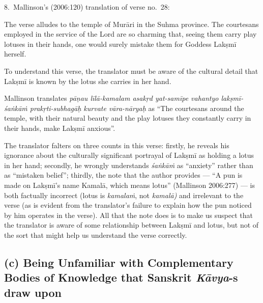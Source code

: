 8.~Mallinson’s (2006:120) translation of verse no.\ 28: 

The verse alludes to the temple of Murāri in the Suhma province. The courtesans employed in the service of the Lord are so charming that, seeing them carry play lotuses in their hands, one would surely mistake them for Goddess Lakṣmī herself. 

To understand this verse, the translator must be aware of the cultural detail that Lakṣmī is known by the lotus she carries in her hand. 

Mallinson translates \textsl{pāṇau līlā-kamalam asakṛd yat-samīpe vahantyo lakṣmī-śaṅkāṁ prakṛti-subhagāḥ kurvate vāra-nāryaḥ} as “The courtesans around the temple, with their natural beauty and the play lotuses they constantly carry in their hands, make Lakṣmī anxious”. 

The translator falters on three counts in this verse: firstly, he reveals his ignorance about the culturally significant portrayal of Lakṣmī as holding a lotus in her hand; secondly, he wrongly understands \textsl{śaṅkāṁ}  as “anxiety” rather than as “mistaken belief”; thirdly, the note that the author provides --- “A pun is made on Lakṣmī’s name Kamalā, which means lotus” (Mallinson 2006:277) --- is both factually incorrect (lotus is \textsl{kamalaṁ}, not \textsl{kamalā)}  and irrelevant to the verse (as is evident from the translator’s failure to explain how the pun noticed by him operates in the verse). All that the note does is to make us suspect that the translator is aware of some relationship between Lakṣmī and lotus, but not of the sort that might help us understand the verse correctly.

\subsection*{(c) Being Unfamiliar with Complementary Bodies of Knowledge that Sanskrit \textsl{Kāvya}-s draw upon}

